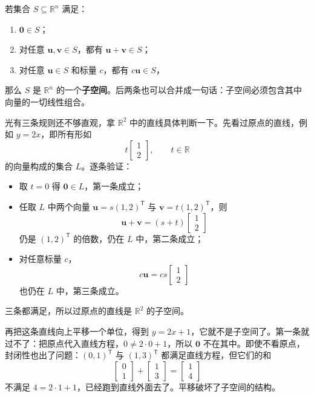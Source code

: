 \documentclass[UTF8,a4paper,12pt]{ctexart}
\numberwithin{equation}{section}
\newcommand{\R}{\mathbb{R}}
\newcommand{\trans}{^{\mathsf T}}
\begin{document}
	若集合 $S\subseteq\R^n$ 满足：
	\begin{enumerate}
		\item $\bm{0}\in S$；
		\item 对任意 $\bm{u},\bm{v}\in S$，都有 $\bm{u}+\bm{v}\in S$；
		\item 对任意 $\bm{u}\in S$ 和标量 $c$，都有 $c\bm{u}\in S$，
	\end{enumerate}
	那么 $S$ 是 $\R^n$ 的一个\textbf{子空间}。后两条也可以合并成一句话：子空间必须包含其中向量的一切线性组合。
	
	光有三条规则还不够直观，拿 $\R^2$ 中的直线具体判断一下。先看过原点的直线，例如 $y=2x$，即所有形如
	\begin{equation}\label{eq:5.1}
	t\begin{bmatrix}1\\2\end{bmatrix},
	\qquad t\in\R
	\end{equation}
	的向量构成的集合 $L$。逐条验证：
	\begin{itemize}
		\item 取 $t=0$ 得 $\bm{0}\in L$，第一条成立；
		\item 任取 $L$ 中两个向量 $\bm{u}=s(1,2)\trans$ 与 $\bm{v}=t(1,2)\trans$，则
		\begin{equation}\label{eq:5.2}
		\bm{u}+\bm{v}=(s+t)\begin{bmatrix}1\\2\end{bmatrix}
		\end{equation}
		仍是 $(1,2)\trans$ 的倍数，仍在 $L$ 中，第二条成立；
		\item 对任意标量 $c$，
		\begin{equation}\label{eq:5.3}
		c\bm{u}=cs\begin{bmatrix}1\\2\end{bmatrix}
		\end{equation}
		也仍在 $L$ 中，第三条成立。
	\end{itemize}
	三条都满足，所以过原点的直线是 $\R^2$ 的子空间。
	
	再把这条直线向上平移一个单位，得到 $y=2x+1$，它就不是子空间了。第一条就过不了：把原点代入直线方程，$0\neq2\cdot0+1$，所以 $\bm{0}$ 不在其中。即使不看原点，封闭性也出了问题：$(0,1)\trans$ 与 $(1,3)\trans$ 都满足直线方程，但它们的和
	\begin{equation}\label{eq:5.4}
	\begin{bmatrix}0\\1\end{bmatrix}
	+
	\begin{bmatrix}1\\3\end{bmatrix}
	=
	\begin{bmatrix}1\\4\end{bmatrix}
	\end{equation}
	不满足 $4=2\cdot1+1$，已经跑到直线外面去了。平移破坏了子空间的结构。
	
\end{document}
